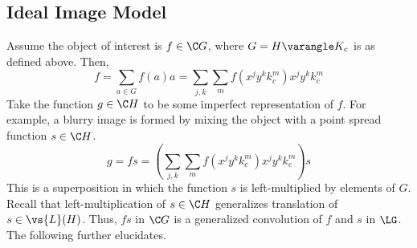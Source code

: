 

\subsection{Ideal Image Model}
Assume the object of interest is $f\in \C G$, where 
$G = H\varangle K_c$ is as defined above.  Then,
\[ 
f = \sum_{a\in G} f(a) a 
  = \sum_{j,k}\sum_{m} f(x^jy^kk_c^m) x^jy^kk_c^m
\]
Take the function $g\in \C H$ to be some imperfect
representation of $f$. 
For example, a blurry image is formed by mixing the object
with a point spread function $s \in \C H$.
\begin{equation}\label{eq:gfs}
g = fs = \left(\sum_{j,k}\sum_{m} f(x^jy^kk_c^m)
x^jy^kk_c^m\right) s
\end{equation}
This is a superposition in which the function $s$ is
left-multiplied by elements of $G$.  Recall that
left-multiplication of $s \in \C H$ generalizes translation
of $s \in \vs{L}(H)$. Thus, $fs$ in $\C G$ is a generalized
convolution of $f$ and $s$ in $\LG$. 
The following further elucidates. 

